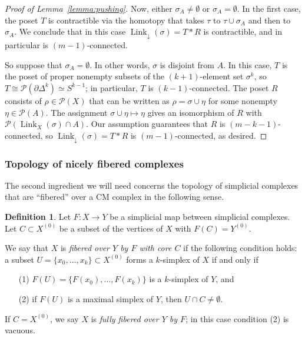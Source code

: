 \documentclass[11 pt]{article}
\theoremstyle{plain}
\theoremstyle{definition}
\newtheorem{definition}[theorem]{Definition}
\numberwithin{equation}{section}
\DeclareMathOperator{\Link}{Link}
\newcommand\Poset{\ensuremath{\mathcal{P}}}
\newcommand\iso{\cong}
\begin{document}
\begin{proof}[{Proof of Lemma~\ref{lemma:pushing}}]
Now, either $\sigma_A \neq \emptyset$ or $\sigma_A=\emptyset$.  In the first case, the poset $T$
is contractible via the homotopy that takes $\tau$ to $\tau \cup \sigma_A$ and then to $\sigma_A$.
We conclude that in this case $\Link_\downarrow(\sigma)=T\ast R$ is contractible, and in particular
is $(m-1)$-connected.

So suppose that $\sigma_A=\emptyset$.  In other words, $\sigma$ is disjoint from $A$. 
In this case, $T$ is the poset of proper nonempty subsets of the $(k+1)$-element set $\sigma^k$, so $T\iso \Poset(\partial \Delta^k)\simeq S^{k-1}$; in particular, $T$ is $(k-1)$-connected.  The poset $R$ consists of $\rho\in \Poset(X)$ that can be written as 
$\rho=\sigma\cup \eta$ for some nonempty $\eta\in \Poset(A)$.  The assignment 
$\sigma\cup \eta\mapsto \eta$ gives an isomorphism of $R$ with $\Poset(\Link_X(\sigma)\cap A)$. Our assumption guarantees that $R$ is $(m-k-1)$-connected, so $\Link_\downarrow(\sigma)=T\ast R$ 
is $(m-1)$-connected, as desired.
\end{proof}

\subsubsection{Topology of nicely fibered complexes}
The second ingredient we will need concerns the topology of simplicial complexes that are ``fibered'' over a CM complex in the following sense.

\begin{definition}
\label{def:fibersCMsplit}
Let $F\colon X\to Y$ be a simplicial map between simplicial complexes.  Let $C\subset X^{(0)}$ be a subset of the vertices of $X$ with $F(C)=Y^{(0)}$.

We say that $X$ is \emph{fibered over $Y$ by $F$ with core $C$} if the following condition holds:
a subset $U=\{x_0,\ldots,x_k\}\subset X^{(0)}$ forms a $k$-simplex of $X$ if and only if 
\begin{enumerate}[topsep=2pt,itemsep=1pt,parsep=1pt]
\item[(1)] $F(U)=\{F(x_0),\ldots,F(x_k)\}$ is a $k$-simplex of $Y$, and
\item[(2)] if $F(U)$ is a maximal simplex of $Y$, then $U\cap C\neq\emptyset$.
\end{enumerate}
If $C=X^{(0)}$, we say $X$ is \emph{fully fibered over $Y$ by $F$}; in this case condition (2) is vacuous.
\end{definition}
\end{document}
